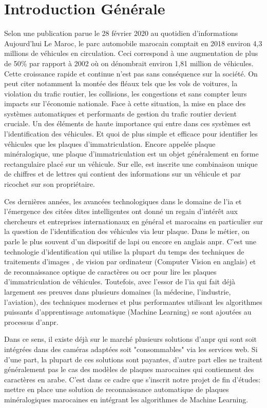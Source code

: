 \chapter*{\textbf{Introduction Générale}}
Selon une publication parue le 28 février 2020 au quotidien d'informations Aujourd'hui Le Maroc, le parc automobile marocain comptait en 2018 environ 4,3 millions de véhicules en circulation. Ceci correspond à une augmentation de plus de 50\% par rapport à 2002 où on dénombrait environ 1,81 million de véhicules. Cette croissance rapide et continue n’est pas sans conséquence sur la société. On peut citer notamment la montée des fléaux tels que les vols de voitures, la violation du trafic routier, les collisions, les congestions et sans compter leurs impacts sur l’économie nationale. Face à cette situation, la mise en place des systèmes automatiques et performants de gestion du trafic routier devient cruciale. Un des éléments de haute importance qui entre dans ces systèmes est l’identification des véhicules. Et quoi de plus simple et efficace pour identifier les véhicules que les plaques d’immatriculation. Encore appelée plaque minéralogique, une plaque d’immatriculation est un objet généralement en forme rectangulaire placé sur un véhicule. Sur elle, est inscrite une combinaison unique de chiffres et de lettres qui contient des informations sur un véhicule et par ricochet sur son propriétaire. 

Ces dernières années, les avancées technologiques dans le domaine de l’\acrshort{ia} et l'émergence des citées dites intelligentes ont donné un regain d'intérêt aux chercheurs et entreprises internationaux en général et marocains en particulier sur la question de l’identification des véhicules via leur plaque. Dans le métier, on  parle le plus souvent d’un dispositif de \acrfull{lapi} ou encore en anglais \acrfull{anpr}. C’est une technologie d’identification qui utilise la plupart du temps des techniques de traitements d’images , de vision par ordinateur (Computer Vision en anglais) et de reconnaissance optique de caractères ou \acrfull{ocr} pour lire les plaques d’immatriculation de véhicules. Toutefois, avec l’essor de l’\acrshort{ia} qui fait déjà largement ses preuves dans plusieurs domaines (la médecine, l’industrie, l’aviation), des techniques modernes et plus performantes utilisant les algorithmes puissants d’apprentissage automatique (Machine Learning) se sont ajoutées au processus d’\acrshort{anpr}. 

Dans ce sens, il existe déjà sur le marché plusieurs solutions d’\acrshort{anpr} qui sont soit intégrées dans des caméras adaptées soit "consommables" via les services web. Si d’une part, la plupart de ces solutions sont payantes, d'autre part elles ne traitent généralement pas le cas des modèles de plaques marocaines qui contiennent des caractères en arabe. C’est dans ce cadre que s’inscrit notre projet de fin d’études: mettre en place une solution de reconnaissance automatique de plaques minéralogiques marocaines en intégrant les algorithmes de Machine Learning.

